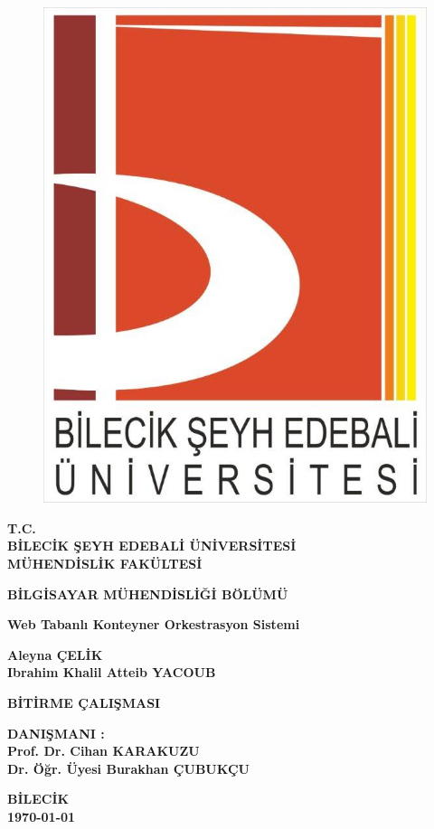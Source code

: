 \thispagestyle{empty}
\begin{figure}[H]
\centering
\includegraphics[scale=0.2]{logomuz}
\end{figure}

\begin{center}
\textbf{T.C.}\\
\textbf{BİLECİK ŞEYH EDEBALİ ÜNİVERSİTESİ}\\
\textbf{MÜHENDİSLİK FAKÜLTESİ}

\textbf{BİLGİSAYAR MÜHENDİSLİĞİ BÖLÜMÜ}
\end{center}
\vfill
\begin{center}
\textbf{Web Tabanlı Konteyner Orkestrasyon Sistemi }

\textbf{Aleyna ÇELİK \\ Ibrahim Khalil Atteib YACOUB}

\textbf{BİTİRME ÇALIŞMASI}
\end{center}
\vfill
\begin{center}
\textbf{DANIŞMANI :\\ Prof. Dr. Cihan KARAKUZU \\ Dr. Öğr. Üyesi Burakhan ÇUBUKÇU}

\textbf{BİLECİK}\\ 
\textbf{\today}
\end{center}

